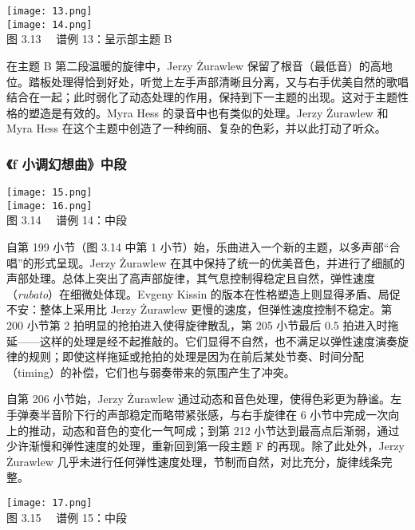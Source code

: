     \begin{center}
    \texttt{[image: 13.png]}\\
    \texttt{[image: 14.png]}\\
    \heiti \fontsize{10.5}{12.6}\selectfont 图 3.13 \ \ 谱例 13：呈示部主题 B
    \end{center}

    在主题 B 第二段温暖的旋律中，Jerzy Żurawlew 保留了根音（最低音）的高地位。踏板处理得恰到好处，听觉上左手声部清晰且分离，又与右手优美自然的歌唱结合在一起；此时弱化了动态处理的作用，保持到下一主题的出现。这对于主题性格的塑造是有效的。Myra Hess 的录音中也有类似的处理。Jerzy Żurawlew 和 Myra Hess 在这个主题中创造了一种绚丽、复杂的色彩，并以此打动了听众。

    \subsubsection{\heiti \fontsize{14}{16.8}\selectfont 《f 小调幻想曲》中段}

    \begin{center}
    \texttt{[image: 15.png]}\\
    \texttt{[image: 16.png]}\\
    \heiti \fontsize{10.5}{12.6}\selectfont 图 3.14 \ \ 谱例 14：中段
    \end{center}

    自第 199 小节（图 3.14 中第 1 小节）始，乐曲进入一个新的主题，以多声部“合唱”的形式呈现。Jerzy Żurawlew 在其中保持了统一的优美音色，并进行了细腻的声部处理。总体上突出了高声部旋律，其气息控制得稳定且自然，弹性速度（\textit{rubato}）在细微处体现。Evgeny Kissin 的版本在性格塑造上则显得矛盾、局促不安：整体上采用比 Jerzy Żurawlew 更慢的速度，但弹性速度控制不稳定。第 200 小节第 2 拍明显的抢拍进入使得旋律散乱，第 205 小节最后 0.5 拍进入时拖延——这样的处理是经不起推敲的。它们显得不自然，也不满足以弹性速度演奏旋律的规则；即使这样拖延或抢拍的处理是因为在前后某处节奏、时间分配（timing）的补偿，它们也与弱奏带来的氛围产生了冲突。

    自第 206 小节始，Jerzy Żurawlew 通过动态和音色处理，使得色彩更为静谧。左手弹奏半音阶下行的声部稳定而略带紧张感，与右手旋律在 6 小节中完成一次向上的推动，动态和音色的变化一气呵成；到第 212 小节达到最高点后渐弱，通过少许渐慢和弹性速度的处理，重新回到第一段主题 F 的再现。除了此处外，Jerzy Żurawlew 几乎未进行任何弹性速度处理，节制而自然，对比充分，旋律线条完整。

    \begin{center}
    \texttt{[image: 17.png]}\\
    \heiti \fontsize{10.5}{12.6}\selectfont 图 3.15 \ \ 谱例 15：中段
    \end{center}

